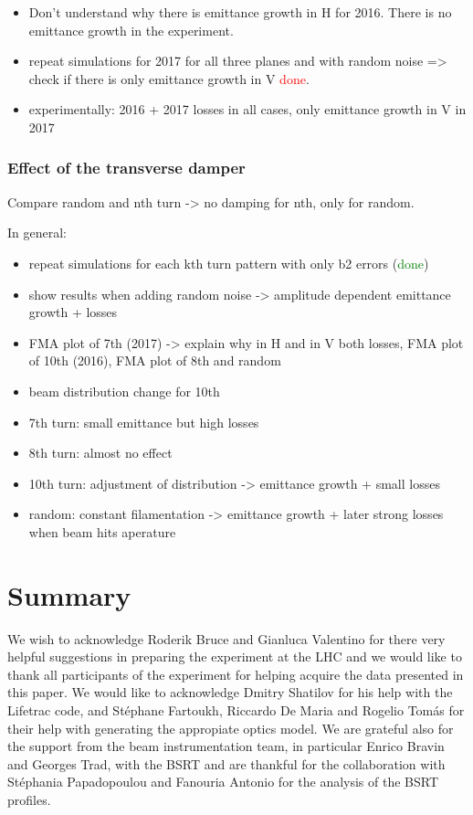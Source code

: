 \documentclass[%
 reprint,
 amsmath,amssymb,
 aps,
prstab,
]{revtex4-1}
\begin{document}
\begin{itemize}
	\item Don't understand why there is emittance growth in H for 2016. There is no emittance growth in the experiment.
	\item repeat simulations for 2017 for all three planes and with random noise => check if there is only emittance growth in V \textcolor{red}{done}.
	\item experimentally: 2016 + 2017 losses in all cases, only emittance growth in V in 2017
\end{itemize}
\subsubsection{Effect of the transverse damper\label{sec:damp}}
Compare random and nth turn -> no damping for nth, only for random.

In general:
\begin{itemize}
	\item repeat simulations for each kth turn pattern with only b2 errors (\textcolor{green}{done})
	\item show results when adding random noise -> amplitude dependent emittance growth + losses
	\item FMA plot of 7th (2017) -> explain why in H and in V both losses, FMA plot of 10th (2016), FMA plot of 8th and random
	\item beam distribution change for 10th
\end{itemize}
\begin{itemize}
	\item 7th turn: small emittance but high losses
	\item 8th turn: almost no effect
	\item 10th turn: adjustment of distribution -> emittance growth + small losses
	\item random: constant filamentation -> emittance growth + later strong losses when beam hits aperature
	
\end{itemize}

\section{Summary\label{sec:sum}}

\begin{acknowledgments}
We wish to acknowledge Roderik Bruce and Gianluca Valentino for there very helpful suggestions in preparing the experiment at the LHC and we would like to thank all participants of the experiment for helping acquire the data presented in this paper. We would like to acknowledge Dmitry Shatilov for his help with the Lifetrac code, and St\'{e}phane Fartoukh, Riccardo De Maria and Rogelio Tomás for their help with generating the appropiate optics model. We are grateful also for the support from the beam instrumentation team, in particular Enrico Bravin and Georges Trad, with the BSRT and are thankful for the collaboration with St\'{e}phania Papadopoulou and Fanouria Antonio for the analysis of the BSRT profiles.
\end{acknowledgments}
\end{document}
